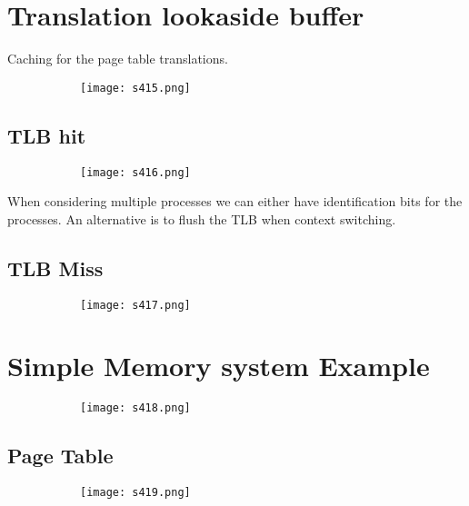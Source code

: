 \documentclass[8pt]{extreport}
\begin{document}
\section{Translation lookaside buffer}

Caching for the page table translations.
\begin{figure}[H]
\begin{subfigure}[b]{0.4\linewidth}
\texttt{[image: s415.png]}
\end{subfigure}
\end{figure}

\subsection{TLB hit}
\begin{figure}[H]
\begin{subfigure}[b]{0.4\linewidth}
\texttt{[image: s416.png]}
\end{subfigure}
\end{figure}
When considering multiple processes we can either have identification bits for the processes. An alternative is to flush the TLB when context switching.
\subsection{TLB Miss}
\begin{figure}[H]
\begin{subfigure}[b]{0.4\linewidth}
\texttt{[image: s417.png]}
\end{subfigure}
\end{figure}

\section{Simple Memory system Example}

\begin{figure}[H]
\begin{subfigure}[b]{0.4\linewidth}
\texttt{[image: s418.png]}
\end{subfigure}
\end{figure}

\subsection{Page Table}

\begin{figure}[H]
\begin{subfigure}[b]{0.4\linewidth}
\texttt{[image: s419.png]}
\end{subfigure}
\end{figure}
\end{document}

